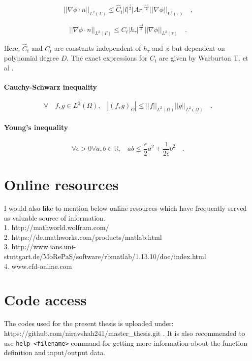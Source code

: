 \documentclass[a4paper,twoside,openright]{book}
\begin{document}
\begin{appendices}
\begin{equation}
||\nabla \phi \cdot n||_{L^2(\Gamma)} \leq \hat{C}_t |l|^{\frac{1}{2}} |Ar|^{\frac{-1}{2}} ||\nabla \phi||_{L^2(\tau)} \quad \textrm{,}
\end{equation}

\begin{equation}
||\nabla \phi \cdot n||_{L^2(\Gamma)} \leq {C}_t |h_\tau|^{\frac{-1}{2}} ||\nabla \phi||_{L^2(\tau)} \quad \textrm{.}
\end{equation}

Here, $\hat{C}_t$ and ${C}_t$ are constants independent of $h_\tau$ and $\phi$ but dependent on polynomial degree $D$. The exact expressions for $C_t$ are given by Warburton T. et al \cite{warburton}.

\subsubsection{Cauchy-Schwarz inequality} 
\begin{equation}
\forall \quad f,g \in L^2(\Omega) \textrm{,} \quad |(f,g)_{\Omega}| \leq ||f||_{L^2(\Omega)} ||g||_{L^2(\Omega)} \quad \textrm{.}
\end{equation}

\subsubsection{Young's inequality} 
\begin{equation}
\forall \epsilon > 0 \forall a,b \in \mathbb{R} \textrm{,} \quad ab \leq \frac{\epsilon}{2}a^2 + \frac{1}{2 \epsilon}b^2 \quad \textrm{.}
\end{equation}

\chapter{Online resources}

I would also like to mention below online resources which have frequently served as valuable source of information.
\\
1. http://mathworld.wolfram.com/\\
2. https://de.mathworks.com/products/matlab.html\\
3. http://www.ians.uni-stuttgart.de/MoRePaS/software/rbmatlab/1.13.10/doc/index.html \\
4. www.cfd-online.com\\

\chapter{Code access}

The codes used for the present thesis is uploaded under: \\
https://github.com/niravshah241/master\_thesis.git . It is also recommended to use \verb|help <filename>| command for getting more information about the function definition and input/output data.




\end{appendices}
\end{document}
